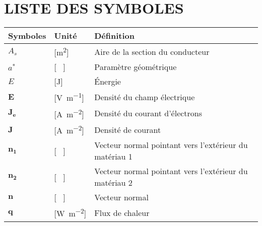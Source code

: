 \chapter*{LISTE DES SYMBOLES}
\pagestyle{pagenumber}
%

%
\begin{longtable}{l p{2.5cm} p{4in}}
	\textbf{Symboles} & \textbf{Unité}                                      & \textbf{Définition}                                                                   \\
	\endhead
	$A_s$   & [\si{\square\metre}]                                & Aire de la section du conducteur                                                      \\
	$a^*$             & [ \ ]                                               & Paramètre géométrique                                                                 \\
	$E$               & [\si{\joule}]                                       & Énergie                                                                               \\
	$\mathbf{E}$      & [\si{\volt\per\metre}]                              & Densité du champ électrique                                                           \\
	$\mathbf{J_e}$    & [\si{\ampere\per\square\metre}]                     & Densité du courant d'électrons                                                        \\
	$\mathbf{J}$      & [\si{\ampere\per\square\metre}]                     & Densité de courant                                                                    \\
	$\mathbf{n_1}$    & [ \ ]                                               & Vecteur normal pointant vers l'extérieur du matériau 1                                \\
	$\mathbf{n_2}$    & [ \ ]                                               & Vecteur normal pointant vers l'extérieur du matériau 2                                \\
	$\mathbf{n}$      & [ \ ]                                               & Vecteur normal                                                                        \\
	$\mathbf{q}$      & [\si{\watt\per\square\metre}]                       & Flux de chaleur                                                                       \\

\end{longtable}

